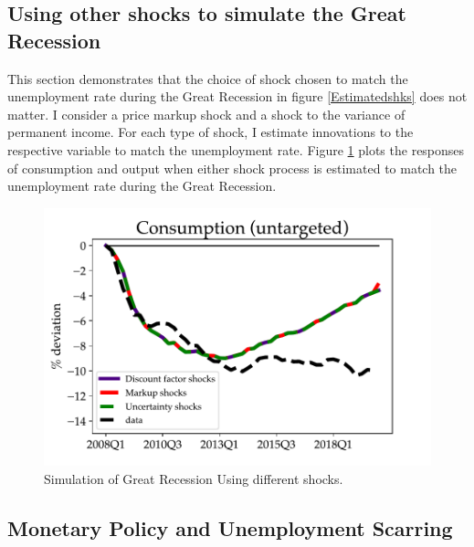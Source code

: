 





\subsection{Using other shocks to simulate the Great Recession}

This section demonstrates that the choice of shock chosen to match the unemployment rate during the Great Recession in figure \ref{Estimatedshks} does not matter. I consider a price markup shock and a shock to the variance of permanent income. For each type of shock, I estimate innovations to the respective variable to match the unemployment rate.  Figure \ref{other_shocks} plots the responses of consumption and output when either shock process is estimated to match the unemployment rate during the Great Recession.
\begin{figure}[!ht]
    \centering
   \begin{minipage}{0.47\textwidth}
        \centering
        \includegraphics[scale=.6]{text/Chapter1/Figures/GR_sim/C_comparisons} %
    \end{minipage}\hfill
    \caption{Simulation of Great Recession Using different shocks.}
    \label{other_shocks}
\end{figure}







\subsection{Monetary Policy and Unemployment Scarring}
\label{appendix:MP}

